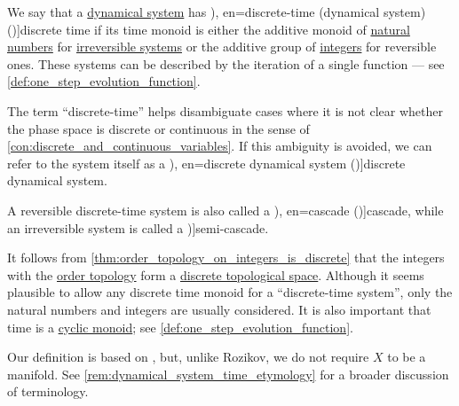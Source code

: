\begin{definition}\label{def:discrete_dynamical_system}\mimprovised
  We say that a \hyperref[def:dynamical_system]{dynamical system} has \term[ru=(динамическая система с) дискретным временем (\cite[10]{Юмагулов2015ДинамическиеСистемы}), en=discrete-time (dynamical system) (\cite[1]{Rozikov2012MultiDimensionalTimeDynamicalSystem})]{discrete time} if its time monoid is either the additive monoid of \hyperref[def:natural_numbers]{natural numbers} for \hyperref[def:reversible_dynamical_system]{irreversible systems} or the additive group of \hyperref[def:integers]{integers} for reversible ones. These systems can be described by the iteration of a single function --- see \cref{def:one_step_evolution_function}.

  The term \enquote{discrete-time} helps disambiguate cases where it is not clear whether the phase space is discrete or continuous in the sense of \cref{con:discrete_and_continuous_variables}. If this ambiguity is avoided, we can refer to the system itself as a \term[ru=дискретная динамическая система (\cite[10]{Юмагулов2015ДинамическиеСистемы}), en=discrete dynamical system (\cite[363]{Rozikov2012MultiDimensionalTimeDynamicalSystem})]{discrete dynamical system}.

  A reversible discrete-time system is also called a \term[ru=каскада (\cite[10]{Юмагулов2015ДинамическиеСистемы}), en=cascade (\cite[363]{Rozikov2012MultiDimensionalTimeDynamicalSystem})]{cascade}, while an irreversible system is called a \term[en=semi-cascade (\cite[363]{Rozikov2012MultiDimensionalTimeDynamicalSystem})]{semi-cascade}.
\end{definition}
\begin{comments}
  \item It follows from \cref{thm:order_topology_on_integers_is_discrete} that the integers with the \hyperref[def:order_topology]{order topology} form a \hyperref[def:discrete_topology]{discrete topological space}. Although it seems plausible to allow any discrete time monoid for a \enquote{discrete-time system}, only the natural numbers and integers are usually considered. It is also important that time is a \hyperref[def:cyclic_monoid]{cyclic monoid}; see \cref{def:one_step_evolution_function}.

  \item Our definition is based on \textcite{Rozikov2012MultiDimensionalTimeDynamicalSystem}, but, unlike Rozikov, we do not require \( X \) to be a manifold. See \cref{rem:dynamical_system_time_etymology} for a broader discussion of terminology.
\end{comments}

